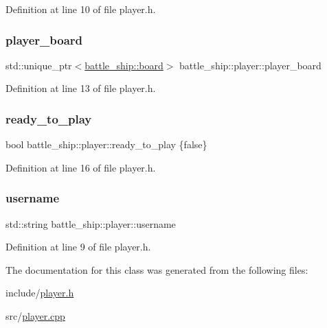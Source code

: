 Definition at line 10 of file player.\+h.

\mbox{\label{classbattle__ship_1_1player_a13008c5d6e7464b312c04ac00e18c2fb}} 
\subsubsection{\texorpdfstring{player\+\_\+board}{player\_board}}
{\footnotesize\ttfamily std\+::unique\+\_\+ptr$<$\hyperlink{classbattle__ship_1_1board}{battle\+\_\+ship\+::board}$>$ battle\+\_\+ship\+::player\+::player\+\_\+board\hspace{0.3cm}{\ttfamily [protected]}}



Definition at line 13 of file player.\+h.

\mbox{\label{classbattle__ship_1_1player_a48a3f8c692c7ea1def384c39b9b65e85}} 
\subsubsection{\texorpdfstring{ready\+\_\+to\+\_\+play}{ready\_to\_play}}
{\footnotesize\ttfamily bool battle\+\_\+ship\+::player\+::ready\+\_\+to\+\_\+play \{false\}\hspace{0.3cm}{\ttfamily [protected]}}



Definition at line 16 of file player.\+h.

\mbox{\label{classbattle__ship_1_1player_aed786567891bcafecb8610e12fb5d413}} 
\subsubsection{\texorpdfstring{username}{username}}
{\footnotesize\ttfamily std\+::string battle\+\_\+ship\+::player\+::username\hspace{0.3cm}{\ttfamily [protected]}}



Definition at line 9 of file player.\+h.



The documentation for this class was generated from the following files\+:\begin{DoxyCompactItemize}
\item 
include/\hyperlink{player_8h}{player.\+h}\item 
src/\hyperlink{player_8cpp}{player.\+cpp}\end{DoxyCompactItemize}
